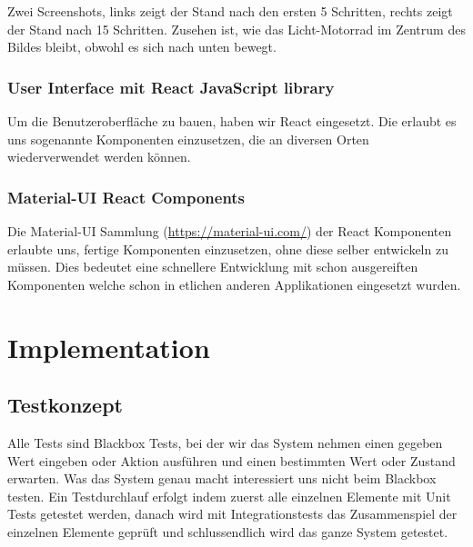 \documentclass[11pt,ngerman]{article}
\begin{document}
	Zwei Screenshots, links zeigt der Stand nach den ersten 5 Schritten, rechts zeigt der Stand nach 15 Schritten. Zusehen ist, wie das Licht-Motorrad im Zentrum des Bildes bleibt, obwohl es sich nach unten bewegt.

    \subsubsection{User Interface mit React JavaScript library}
    Um die Benutzeroberfläche zu bauen, haben wir \Gls{React} eingesetzt. Die erlaubt es uns sogenannte Komponenten einzusetzen, die an diversen Orten wiederverwendet werden können.

    \subsubsection{Material-UI React Components}
    Die Material-UI Sammlung (\url{https://material-ui.com/}) der \Gls{React} Komponenten erlaubte uns, fertige Komponenten einzusetzen, ohne diese selber entwickeln zu müssen. Dies bedeutet eine schnellere Entwicklung mit schon ausgereiften Komponenten welche schon in etlichen anderen Applikationen eingesetzt wurden.


    \section{Implementation}

    \subsection{Testkonzept}
    Alle Tests sind Blackbox Tests, bei der wir das System nehmen einen gegeben Wert eingeben oder Aktion ausführen und einen bestimmten Wert oder Zustand erwarten. Was das System genau macht interessiert uns nicht beim Blackbox testen. Ein Testdurchlauf erfolgt indem zuerst alle einzelnen Elemente mit Unit Tests getestet werden, danach wird mit Integrationstests das Zusammenspiel der einzelnen Elemente geprüft und schlussendlich wird das ganze System getestet.
\end{document}
